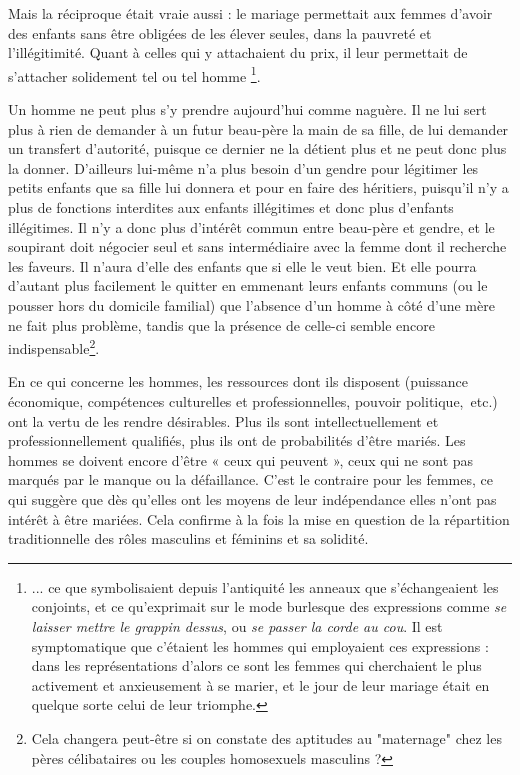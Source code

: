  Mais la réciproque était vraie aussi : le mariage permettait aux femmes d'avoir des enfants sans être obligées de les élever seules, dans la pauvreté et l'illégitimité. Quant à celles qui y attachaient du prix, il leur permettait de s'attacher solidement tel ou tel homme
\footnote{... ce que symbolisaient depuis l'antiquité les anneaux que s'échangeaient les conjoints, et ce qu'exprimait sur le mode burlesque des expressions comme {\emph{se laisser mettre le grappin dessus}}, ou {\emph{se passer la corde au cou}}. Il est symptomatique que c'étaient les hommes qui employaient ces expressions : dans les représentations d'alors ce sont les femmes qui cherchaient le plus activement et anxieusement à se marier, et le jour de leur mariage était en quelque sorte celui de leur triomphe.}.
 
Un homme ne peut plus s'y prendre aujourd'hui comme naguère. Il ne lui sert plus à rien de demander à un futur beau-père la main de sa fille, de lui demander un transfert d'autorité, puisque ce dernier ne la détient plus et ne peut donc plus la donner. D'ailleurs lui-même n'a plus besoin d'un gendre pour légitimer les petits enfants que sa fille lui donnera et pour en faire des héritiers, puisqu'il n'y a plus de fonctions interdites aux enfants illégitimes et donc plus d'enfants illégitimes. Il n'y a donc plus d'intérêt commun entre beau-père et gendre, et le soupirant doit négocier seul et sans intermédiaire avec la femme dont il recherche les faveurs. Il n'aura d'elle des enfants que si elle le veut bien. Et elle pourra d'autant plus facilement le quitter en emmenant leurs enfants communs (ou le pousser hors du domicile familial) que l'absence d'un homme à côté d'une mère ne fait plus problème, tandis que la présence de celle-ci semble encore indispensable\footnote{Cela changera peut-être si on constate des aptitudes au "maternage" chez les pères célibataires ou les couples homosexuels masculins ?}. 
 
 En ce qui concerne les hommes, les ressources dont ils disposent (puissance économique, compétences culturelles et professionnelles, pouvoir politique,~etc.) ont la vertu de les rendre désirables. Plus ils sont intellectuellement et professionnellement qualifiés, plus ils ont de probabilités d'être mariés. Les hommes se doivent encore d'être « ceux qui peuvent », ceux qui ne sont pas marqués par le manque ou la défaillance.  C'est le contraire pour les femmes, ce qui suggère que dès qu'elles ont les moyens de leur indépendance elles n'ont pas intérêt à être mariées. Cela confirme à la fois la mise en question de la répartition traditionnelle des rôles masculins et féminins et sa solidité.
 
